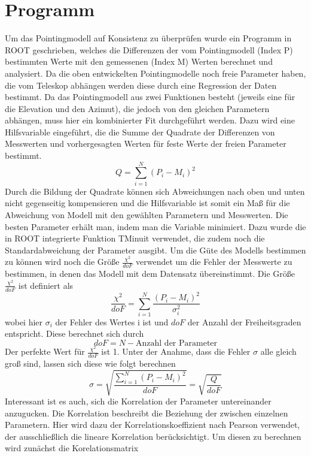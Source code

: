\section{Programm}
Um das Pointingmodell auf Konsistenz zu überprüfen wurde ein Programm in ROOT geschrieben, welches die Differenzen der vom Pointingmodell (Index P) bestimmten Werte mit den gemessenen (Index M) Werten berechnet und analysiert. Da die oben entwickelten Pointingmodelle noch freie Parameter haben, die vom Teleskop abhängen werden diese durch eine Regression der Daten bestimmt. Da das Pointingmodell aus zwei Funktionen besteht (jeweils eine für die Elevation und den Azimut), die jedoch von den gleichen Parametern abhängen, muss hier ein kombinierter Fit durchgeführt werden. Dazu wird eine Hilfsvariable eingeführt, die die Summe der Quadrate der Differenzen von Messwerten und vorhergesagten Werten für feste Werte der freien Parameter bestimmt.
\begin{equation}
Q=\sum^N_{i=1}\left(P_i-M_i\right)^2
\end{equation}
Durch die Bildung der Quadrate können sich Abweichungen nach oben und unten nicht gegenseitig kompensieren und die Hilfsvariable ist somit ein Maß für die Abweichung von Modell mit den gewählten Parametern und Messwerten. Die besten Parameter erhält man, indem man die Variable minimiert. Dazu wurde die in ROOT integrierte Funktion TMinuit verwendet, die zudem noch die Standardabweichung der Parameter ausgibt. Um die Güte des Modells bestimmen zu können wird noch die Größe $\frac{\chi^2}{doF}$ verwendet um die Fehler der Messwerte zu bestimmen, in denen das Modell mit dem Datensatz übereinstimmt. Die Größe $\frac{\chi^2}{doF}$ ist definiert als
\begin{equation}
\frac{\chi^2}{doF}=\sum^N_{i=1}\frac{\left(P_i-M_i\right)^2}{\sigma_i^2}
\end{equation}
wobei hier $\sigma_i$ der Fehler des Wertes i ist und $doF$ der Anzahl der Freiheitsgraden entspricht. Diese berechnet sich durch
\begin{equation}
doF=N-\textrm{Anzahl der Parameter}
\end{equation}
Der perfekte Wert für $\frac{\chi^2}{doF}$ ist 1. Unter der Anahme, dass die Fehler $\sigma$ alle gleich groß sind, lassen sich diese wie folgt berechnen
\begin{equation}
\sigma=\sqrt{\frac{\sum^N_{i=1}\left(P_i-M_i\right)^2}{doF}}=\sqrt{\frac{Q}{doF}}
\end{equation}
Interessant ist es auch, sich die Korrelation der Parameter untereinander anzugucken. Die Korrelation beschreibt die Beziehung der zwischen einzelnen Parametern. Hier wird dazu der Korrelationskoeffizient nach Pearson verwendet, der ausschließlich die lineare Korrelation berücksichtigt. Um diesen zu berechnen wird zunächst die Korelationsmatrix
